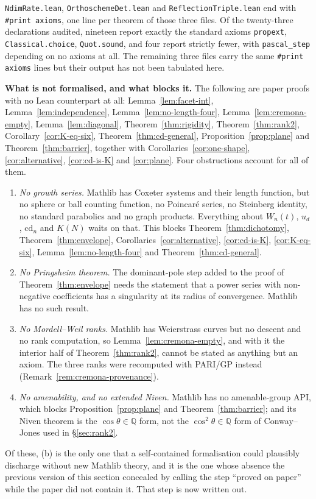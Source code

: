 \documentclass[11pt,a4paper]{article}
\newcommand{\Q}{\mathbb{Q}}
\newcommand{\cd}{\mathrm{cd}}
\theoremstyle{definition}
\theoremstyle{remark}
\theoremstyle{plain}
\begin{document}
\medskip
\texttt{NdimRate.lean}, \texttt{OrthoschemeDet.lean} and \texttt{ReflectionTriple.lean} end
with \verb|#print axioms|, one line per theorem of those three files. Of the twenty-three
declarations audited, nineteen report exactly the standard axioms \verb|propext|,
\verb|Classical.choice|, \verb|Quot.sound|, and four report strictly fewer, with
\texttt{pascal\_step} depending on no axioms at all. The remaining three files carry the same
\verb|#print axioms| lines but their output has not been tabulated here.

\medskip
\noindent\textbf{What is not formalised, and what blocks it.} The following are paper proofs
with no Lean counterpart at all: Lemma~\ref{lem:facet-int}, Lemma~\ref{lem:independence},
Lemma~\ref{lem:no-length-four}, Lemma~\ref{lem:cremona-empty}, Lemma~\ref{lem:diagonal},
Theorem~\ref{thm:rigidity}, Theorem~\ref{thm:rank2}, Corollary~\ref{cor:K-eq-six},
Theorem~\ref{thm:cd-general}, Proposition~\ref{prop:plane} and Theorem~\ref{thm:barrier},
together with Corollaries~\ref{cor:one-shape}, \ref{cor:alternative}, \ref{cor:cd-is-K} and
\ref{cor:plane}. Four obstructions account for all of them.
\begin{enumerate}[label=(\alph*),leftmargin=2.2em,itemsep=0.25em]
\item \emph{No growth series.} Mathlib has Coxeter systems and their length function, but no
sphere or ball counting function, no Poincar\'e series, no Steinberg identity, no standard
parabolics and no graph products. Everything about $W_n(t)$, $u_d$, $\cd_n$ and $K(N)$ waits
on that. This blocks Theorem~\ref{thm:dichotomy}, Theorem~\ref{thm:envelope},
Corollaries~\ref{cor:alternative}, \ref{cor:cd-is-K}, \ref{cor:K-eq-six},
Lemma~\ref{lem:no-length-four} and Theorem~\ref{thm:cd-general}.
\item \emph{No Pringsheim theorem.} The dominant-pole step added to the proof of
Theorem~\ref{thm:envelope} needs the statement that a power series with non-negative
coefficients has a singularity at its radius of convergence. Mathlib has no such result.
\item \emph{No Mordell--Weil ranks.} Mathlib has Weierstrass curves but no descent and no rank
computation, so Lemma~\ref{lem:cremona-empty}, and with it the interior half of
Theorem~\ref{thm:rank2}, cannot be stated as anything but an axiom. The three ranks were
recomputed with PARI/GP instead (Remark~\ref{rem:cremona-provenance}).
\item \emph{No amenability, and no extended Niven.} Mathlib has no amenable-group API, which
blocks Proposition~\ref{prop:plane} and Theorem~\ref{thm:barrier}; and its Niven theorem is
the $\cos\theta\in\Q$ form, not the $\cos^2\theta\in\Q$ form of Conway--Jones used in
\S\ref{sec:rank2}.
\end{enumerate}
Of these, (b) is the only one that a self-contained formalisation could plausibly discharge
without new Mathlib theory, and it is the one whose absence the previous version of this
section concealed by calling the step ``proved on paper'' while the paper did not contain it.
That step is now written out.
\end{document}
